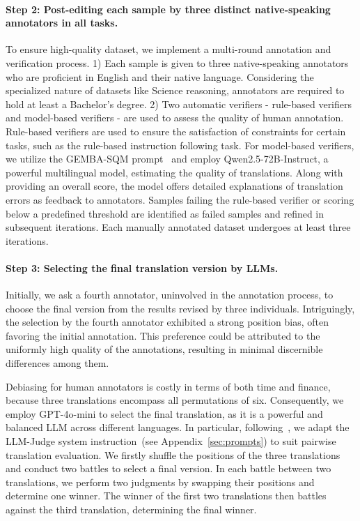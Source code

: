 \paragraph{Step 2: Post-editing each sample by three distinct native-speaking annotators in all tasks.}
To ensure high-quality dataset, we implement a multi-round annotation and verification process. 
1) Each sample is given to three native-speaking annotators who are proficient in English and their native language. Considering the specialized nature of datasets like Science reasoning, annotators are required to hold at least a Bachelor's degree. 
2) Two automatic verifiers - rule-based verifiers and model-based verifiers - are used to assess the quality of human annotation. Rule-based verifiers are used to ensure the satisfaction of constraints for certain tasks, such as the rule-based instruction following task.
For model-based verifiers, we utilize the GEMBA-SQM prompt~\cite{kocmi-federmann-2023-large} and employ Qwen2.5-72B-Instruct, a powerful multilingual model, estimating the quality of translations. 
Along with providing an overall score, the model offers detailed explanations of translation errors as feedback to annotators. 
Samples failing the rule-based verifier or scoring below a predefined threshold are identified as failed samples and refined in subsequent iterations. 
Each manually annotated dataset undergoes at least three iterations.



\paragraph{Step 3: Selecting the final translation version by LLMs.}

Initially, we ask a fourth annotator, uninvolved in the annotation process, to choose the final version from the results revised by three individuals. Intriguingly, the selection by the fourth annotator exhibited a strong position bias, often favoring the initial annotation. This preference could be attributed to the uniformly high quality of the annotations, resulting in minimal discernible differences among them.

Debiasing for human annotators is costly in terms of both time and finance, because three translations encompass all permutations of six.
Consequently, we employ GPT-4o-mini to select the final translation, as it is a powerful and balanced LLM across different languages.
In particular, following~\citet{li2024crowdsourced}, we adapt the LLM-Judge system instruction~(see Appendix~\ref{sec:prompts}) to suit pairwise translation evaluation.
We firstly shuffle the positions of the three translations and conduct two battles to select a final version.
In each battle between two translations, we perform two judgments by swapping their positions and determine one winner.
The winner of the first two translations then battles against the third translation, determining the final winner.

